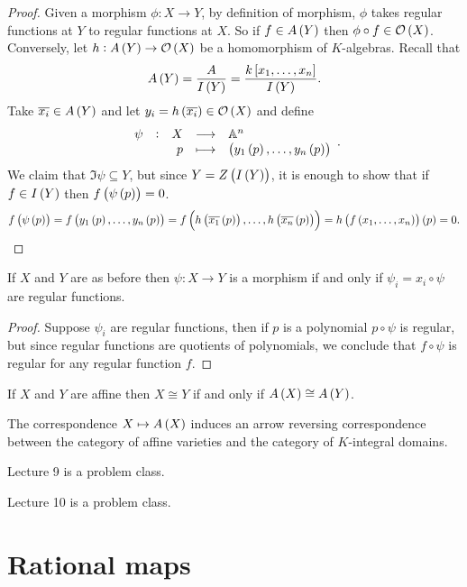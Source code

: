 \begin{proof}
Given a morphism $ \phi : X \to Y $, by definition of morphism, $ \phi $ takes regular functions at $ Y $ to regular functions at $ X $. So if $ f \in A\br{Y} $ then $ \phi \circ f \in \OOO\br{X} $. Conversely, let $ h : A\br{Y} \to \OOO\br{X} $ be a homomorphism of $ K $-algebras. Recall that
$$ A\br{Y} = \dfrac{A}{I\br{Y}} = \dfrac{k\sbr{x_1, \dots, x_n}}{I\br{Y}}. $$
Take $ \overline{x_i} \in A\br{Y} $ and let $ y_i = h\br{\overline{x_i}} \in \OOO\br{X} $ and define
$$ \function[\psi]{X}{\AA^n}{p}{\br{y_1\br{p}, \dots, y_n\br{p}}}. $$
We claim that $ \Im \psi \subseteq Y $, but since $ Y = Z\br{I\br{Y}} $, it is enough to show that if $ f \in I\br{Y} $ then $ f\br{\psi\br{p}} = 0 $.
$$ f\br{\psi\br{p}} = f\br{y_1\br{p}, \dots, y_n\br{p}} = f\br{h\br{\overline{x_1}\br{p}}, \dots, h\br{\overline{x_n}\br{p}}} = h\br{f\br{x_1, \dots, x_n}}\br{p} = 0. $$
\end{proof}

\begin{lemma}
If $ X $ and $ Y $ are as before then $ \psi : X \to Y $ is a morphism if and only if $ \psi_i = x_i \circ \psi $ are regular functions.
\end{lemma}

\begin{proof}
Suppose $ \psi_i $ are regular functions, then if $ p $ is a polynomial $ p \circ \psi $ is regular, but since regular functions are quotients of polynomials, we conclude that $ f \circ \psi $ is regular for any regular function $ f $.
\end{proof}

\begin{corollary}
If $ X $ and $ Y $ are affine then $ X \cong Y $ if and only if $ A\br{X} \cong A\br{Y} $.
\end{corollary}

\begin{corollary}
The correspondence $ X \mapsto A\br{X} $ induces an arrow reversing correspondence between the category of affine varieties and the category of $ K $-integral domains.
\end{corollary}


Lecture 9 is a problem class.


Lecture 10 is a problem class.

\pagebreak

\section{Rational maps}


